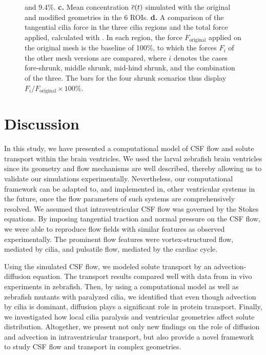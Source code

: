 \documentclass{WileyMSP-template}
\begin{document}
\begin{figure}
{    and 9.4\%.
    \textbf{c.} Mean concentration $\overline{c}(t)$ simulated with the original and modified geometries
    in the 6 ROIs.
    \textbf{d.} A comparison of the tangential cilia force in the three cilia regions
    and the total force applied, calculated with .
    In each region, the force $F_{\mathrm{original}}$ 
    applied on the original mesh is the baseline of 100\%,
    to which the forces $F_i$ of the other mesh versions are compared, where $i$ denotes
    the cases fore-shrunk, middle shrunk, mid-hind shrunk, and the combination of the three.
    The bars for the four shrunk scenarios thus
    display $F_i/F_{\mathrm{original}}\times 100\%$.}
    \label{fig:fig6}
\end{figure}

\section{Discussion}
In this study, we have presented a computational model of CSF flow and
solute transport within the brain ventricles.
We used the larval zebrafish brain ventricles since its geometry and
flow mechanisms are well described, thereby allowing us to validate
our simulations experimentally. Nevertheless, our computational framework can be adapted to,
and implemented in, other ventricular systems in the future, once the flow parameters of such systems
are comprehensively resolved. We assumed that intraventricular CSF flow was governed
by the Stokes equations.
By imposing tangential traction and normal pressure
on the CSF flow, we were able to reproduce flow fields with similar features
as observed experimentally. The prominent flow features were vortex-structured flow,
mediated by cilia, and pulsatile flow, mediated by the cardiac cycle.

Using the simulated CSF flow, we modeled solute transport by an advection-diffusion equation.
The transport results compared well with data from in vivo experiments in zebrafish.
Then, by using a computational model as well as zebrafish mutants with paralyzed cilia,
we identified that even though advection by cilia is dominant,
diffusion plays a significant role in protein transport.
Finally, we investigated how local cilia paralysis and ventricular geometries
affect solute distribution. Altogether, we present not only new findings on the role of
diffusion and advection in intraventricular transport, but also provide a novel framework to
study CSF flow and transport in complex geometries.
\end{document}
